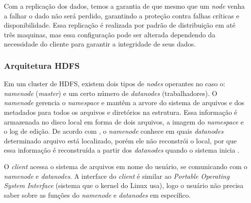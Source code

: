                 Com a replicação dos dados, temos a garantia de que mesmo que um \textit{node} venha a falhar o dado
                não será perdido, garantindo a proteção contra falhas críticas e disponibilidade. Essa replicação é realizada
                por padrão de distribuição em até três maquinas, mas essa configuração pode ser alterada dependendo da
                necessidade do cliente para garantir a integridade de seus dados.

            \subsubsection{Arquitetura HDFS}

                Em um cluster de HDFS, existem dois tipos de \textit{nodes} operantes no caso o: \textit{namenode} (\textit{master})
                e um certo número de \textit{datanodes} (trabalhadores). O \textit{namenode} gerencia o \textit{namespace} e
                mantêm a arvore do sistema de arquivos e dos metadados para todos os arquivos e diretórios na estrutura. Essa
                informação é armazenada no disco local em forma de dois arquivos, a imagem do \textit{namespace} e o log de edição.
                De acordo com , o \textit{namenode} conhece em quais \textit{datanodes}  determinado
                arquivo está localizado, porém ele não reconstrói o local, por que essa informação é reconstruída a partir dos
                \textit{datanodes} quando o sistema inicia \cite{white2015}.

                O \textit{client} acessa o sistema de arquivos em nome do usuário, se comunicando com o \textit{namenode} e
                \textit{datanodes}. A interface do \textit{client} é similar ao \textit{Portable Operating System Interface} (sistema
                que o kernel do Linux usa), logo o usuário não precisa saber sobre as funções do \textit{namenode} e
                \textit{datanodes} em específico.

